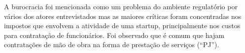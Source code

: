 A burocracia foi mencionada como um problema do ambiente regulatório por vários dos atores entrevistados mas as maiores críticas foram concentradas nos impostos que envolvem a atividade de uma startup, principalmente nos custos para contratação de funcionários. Foi observado que é comum que hajam contratações de mão de obra na forma de prestação de serviços (``PJ'').

